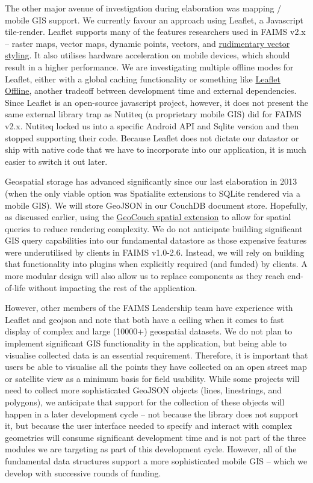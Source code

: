 \documentclass[a4paper,headings=small fontsize=10pt]{scrreprt}
\begin{document}
The other major avenue of investigation during elaboration was mapping /
mobile GIS support. We currently favour an approach using Leaflet, a
Javascript tile-render. Leaflet supports many of the features
researchers used in FAIMS v2.x -- raster maps, vector maps, dynamic
points, vectors, and
\href{https://leafletjs.com/\#features}{{rudimentary vector styling}}.
It also utilises hardware acceleration on mobile devices, which should
result in a higher performance. We are investigating multiple offline
modes for Leaflet, either with a global caching functionality or
something like
\href{https://github.com/allartk/leaflet.offline}{{Leaflet Offline}},
another tradeoff between development time and external dependencies.
Since Leaflet is an open-source javascript project, however, it does not
present the same external library trap as Nutiteq (a proprietary mobile
GIS) did for FAIMS v2.x. Nutiteq locked us into a specific Android API
and Sqlite version and then stopped supporting their code. Because
Leaflet does not dictate our datastor or ship with native code that we
have to incorporate into our application, it is much easier to switch it
out later.

Geospatial storage has advanced significantly since our last elaboration
in 2013 (when the only viable option was Spatialite extensions to SQLite
rendered via a mobile GIS). We will store GeoJSON in our CouchDB
document store. Hopefully, as discussed earlier, using the
\href{https://github.com/couchbase/geocouch}{{GeoCouch spatial
extension}} to allow for spatial queries to reduce rendering complexity.
We do not anticipate building significant GIS query capabilities into
our fundamental datastore as those expensive features were underutilised
by clients in FAIMS v1.0-2.6. Instead, we will rely on building that
functionality into plugins when explicitly required (and funded) by
clients. A more modular design will also allow us to replace components
as they reach end-of-life without impacting the rest of the application.

However, other members of the FAIMS Leadership team have experience with
Leaflet and geojson and note that both have a ceiling when it comes to
fast display of complex and large (10000+) geospatial datasets. We do
not plan to implement significant GIS functionality in the application,
but being able to visualise collected data is an essential requirement.
Therefore, it is important that users be able to visualise all the
points they have collected on an open street map or satellite view as a
minimum basis for field usability. While some projects will need to
collect more sophisticated GeoJSON objects (lines, linestrings, and
polygons), we anticipate that support for the collection of these
objects will happen in a later development cycle -- not because the
library does not support it, but because the user interface needed to
specify and interact with complex geometries will consume significant
development time and is not part of the three modules we are targeting
as part of this development cycle. However, all of the fundamental data
structures support a more sophisticated mobile GIS -- which we develop
with successive rounds of funding.
\end{document}
